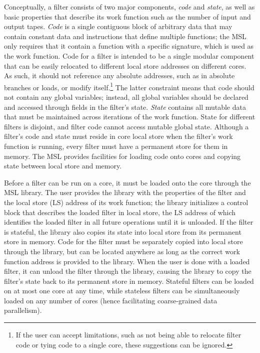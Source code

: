Conceptually, a filter consists of two major components, \emph{code}
and \emph{state}, as well as basic properties that describe its work
function such as the number of input and output tapes. \emph{Code} is
a single contiguous block of arbitrary data that may contain constant
data and instructions that define multiple functions; the MSL only
requires that it contain a function with a specific signature, which
is used as the work function. Code for a filter is intended to be a
single modular component that can be easily relocated to different
local store addresses on different cores. As such, it should not
reference any absolute addresses, such as in absolute branches or
loads, or modify itself.\footnote{If the user can accept limitations,
such as not being able to relocate filter code or tying code to a
single core, these suggestions can be ignored.} The latter constraint
means that code should not contain any global variables; instead, all
global variables should be declared and accessed through fields in the
filter's state. \emph{State} contains all mutable data that must be
maintained across iterations of the work function. State for different
filters is disjoint, and filter code cannot access mutable global
state. Although a filter's code and state must reside in core local
store when the filter's work function is running, every filter must
have a permanent store for them in memory. The MSL provides
facilities for loading code onto cores and copying state between local
store and memory.

Before a filter can be run on a core, it must be loaded onto the core
through the MSL library. The user provides the library with the
properties of the filter and the local store (LS) address of its work
function; the library initializes a control block that describes the
loaded filter in local store, the LS address of which identifies the
loaded filter in all future operations until it is unloaded. If the filter is stateful, the
library also copies its state into local store from its permanent
store in memory. Code for the filter must be separately copied into
local store through the library, but can be located anywhere as long
as the correct work function address is provided to the library. When
the user is done with a loaded filter, it can unload the filter
through the library, causing the library to copy the filter's state
back to its permanent store in memory. Stateful filters can be loaded
on at most one core at any time, while stateless filters can be
simultaneously loaded on any number of cores (hence facilitating
coarse-grained data parallelism).


